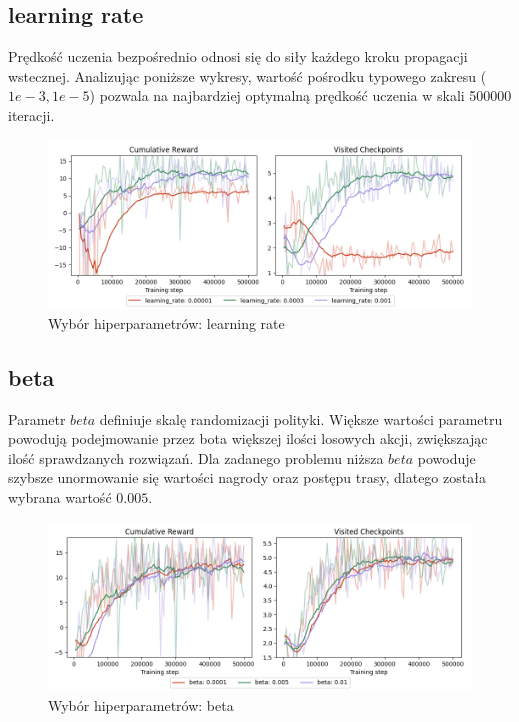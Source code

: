 \subsection{learning rate}
Prędkość uczenia bezpośrednio odnosi się do siły każdego kroku propagacji wstecznej. Analizując poniższe wykresy, wartość pośrodku typowego zakresu ($1e-3, 1e-5$) pozwala na najbardziej optymalną prędkość uczenia w skali 500000 iteracji.
\begin{figure}[H]
    \centering
    \includegraphics[width=\textwidth]{graphs/hyperparameters_learning_rate.png}
    \caption{Wybór hiperparametrów: learning rate}
    \label{fig}
\end{figure}

\subsection{beta}
Parametr $beta$ definiuje skalę randomizacji polityki. Większe wartości parametru powodują podejmowanie przez bota większej ilości losowych akcji, zwiększając ilość sprawdzanych rozwiązań. Dla zadanego problemu niższa $beta$ powoduje szybsze unormowanie się wartości nagrody oraz postępu trasy, dlatego została wybrana wartość $0.005$.
\begin{figure}[H]
    \centering
    \includegraphics[width=\textwidth]{graphs/hyperparameters_beta.png}
    \caption{Wybór hiperparametrów: beta}
    \label{fig}
\end{figure}
\clearpage

